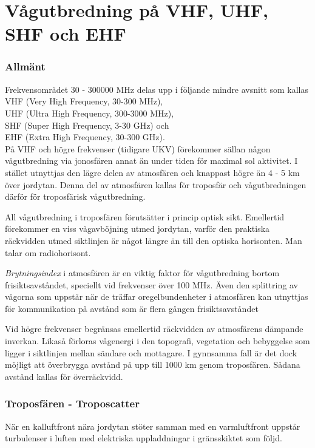 \section{Vågutbredning på VHF, UHF, SHF och EHF}

\subsubsection{Allmänt}
Frekvensområdet 30 - 300000 MHz delas upp
i följande mindre avsnitt som kallas \\
VHF (Very High Frequency, 30-300 MHz), \\
UHF (Ultra High Frequency, 300-3000 MHz), \\
SHF (Super High Frequency, 3-30 GHz) och \\
EHF (Extra High Frequency, 30-300 GHz). \\

På VHF och högre frekvenser (tidigare UKV) förekommer sällan någon
vågutbredning via jonosfären annat än under tiden för maximal sol
aktivitet. I stället utnyttjas den lägre delen av atmosfären och
knappast högre än 4 - 5 km över jordytan. Denna del av atmosfären
kallas för troposfär och vågutbredningen därför för troposfärisk
vågutbredning.

All vågutbredning i troposfären förutsätter i princip optisk
sikt. Emellertid förekommer en viss vågavböjning utmed jordytan,
varför den praktiska räckvidden utmed siktlinjen är något längre än
till den optiska horisonten. Man talar om radiohorisont.

\emph{Brytningsindex} i atmosfären är en viktig faktor för
vågutbredning bortom frisiktsavståndet, speciellt vid frekvenser över
100 MHz. Även den splittring av vågorna som uppstår när de träffar
oregelbundenheter i atmosfären kan utnyttjas för kommunikation på
avstånd som är flera gången frisiktsavståndet

Vid högre frekvenser begränsas emellertid räckvidden av atmosfärens
dämpande inverkan. Likaså förloras vågenergi i den topografi,
vegetation och bebyggelse som ligger i siktlinjen mellan sändare och
mottagare. I gynnsamma fall är det dock möjligt att överbrygga avstånd
på upp till 1000 km genom troposfären. Sådana avstånd kallas för
överräckvidd.

\subsubsection{Troposfären - Troposcatter}

När en kalluftfront nära jordytan stöter samman med en varmluftfront
uppstår turbulenser i luften med elektriska uppladdningar i
gränsskiktet som följd.

